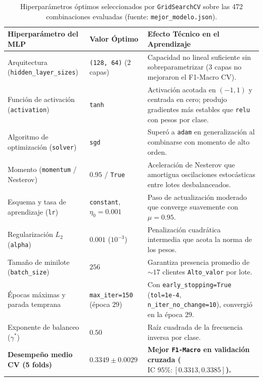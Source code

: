 \documentclass[11pt,a4paper]{article}
\newcommand{\code}[1]{\texttt{\small #1}}
\begin{document}
\begin{table}[H]
\centering
\caption{Hiperparámetros óptimos seleccionados por \code{GridSearchCV} sobre las 472 combinaciones evaluadas (fuente: \code{mejor\_modelo.json}).}
\footnotesize
\setlength{\tabcolsep}{4.5pt}
\begin{tabularx}{\textwidth}{ll >{\raggedright\arraybackslash}X}
\toprule
\textbf{Hiperparámetro del MLP} & \textbf{Valor Óptimo} & \textbf{Efecto Técnico en el Aprendizaje} \\
\midrule
Arquitectura (\code{hidden\_layer\_sizes}) & \code{(128, 64)} ($2$ capas) & Capacidad no lineal suficiente sin sobreparametrizar ($3$ capas no mejoraron el F1-Macro CV). \\
Función de activación (\code{activation}) & \code{tanh} & Activación acotada en $(-1, 1)$ y centrada en cero; produjo gradientes más estables que \code{relu} con pesos por clase. \\
Algoritmo de optimización (\code{solver}) & \code{sgd} & Superó a \code{adam} en generalización al combinarse con momento de alto orden. \\
Momento (\code{momentum} / Nesterov) & $0.95$ / \code{True} & Aceleración de Nesterov que amortigua oscilaciones estocásticas entre lotes desbalanceados. \\
Esquema y tasa de aprendizaje (\code{lr}) & \code{constant}, $\eta_0 = 0.001$ & Paso de actualización moderado que converge suavemente con $\mu = 0.95$. \\
Regularización $L_2$ (\code{alpha}) & $0.001$ ($10^{-3}$) & Penalización cuadrática intermedia que acota la norma de los pesos. \\
Tamaño de minilote (\code{batch\_size}) & $256$ & Garantiza presencia promedio de $\sim 17$ clientes \code{Alto\_valor} por lote. \\
Épocas máximas y parada temprana & \code{max\_iter=150} (época $29$) & Con \code{early\_stopping=True} (\code{tol=1e-4}, \code{n\_iter\_no\_change=10}), convergió en la época $29$. \\
Exponente de balanceo ($\gamma^*$) & $0.50$ & Raíz cuadrada de la frecuencia inversa por clase. \\
\textbf{Desempeño medio CV (5 folds)} & $\mathbf{0.3349 \pm 0.0029}$ & \textbf{Mejor \code{F1-Macro} en validación cruzada ($\text{IC } 95\%: [0.3313, 0.3385]$).} \\
\bottomrule
\end{tabularx}
\end{table}
\end{document}
